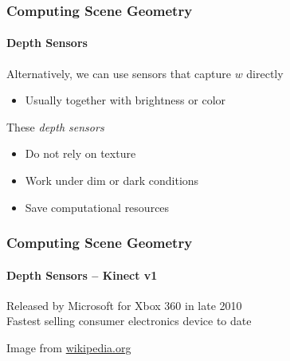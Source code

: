 \documentclass[xetex,professionalfont]{beamer}
\begin{document}
\begin{frame}
\frametitle{Computing Scene Geometry}
\framesubtitle{Depth Sensors}

Alternatively, we can use sensors that capture $w$ directly
\begin{itemize}
    \item Usually together with brightness or color
\end{itemize}

\bigskip
These \emph{depth sensors}
\begin{itemize}
    \item Do not rely on texture
    \item Work under dim or dark conditions
    \item Save computational resources %
\end{itemize}

\end{frame}


\begin{frame}
\frametitle{Computing Scene Geometry}
\framesubtitle{Depth Sensors -- Kinect v1}

Released by Microsoft for Xbox 360 in late 2010\\\medskip
Fastest selling consumer electronics device to date %

\bigskip
\begin{center}
    {\centering Image from \url{wikipedia.org}}
\end{center}

\end{frame}

\end{document}
